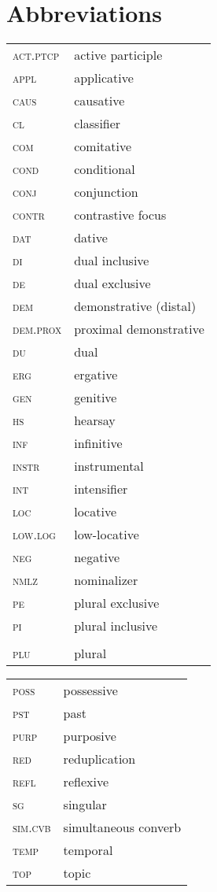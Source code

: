 \documentclass[output=paper]{langscibook}
\begin{document}
\section*{Abbreviations}
\begin{tabularx}{.45\textwidth}{lQ}
\textsc{act.ptcp} & active participle\\
\textsc{appl} &   applicative \\
\textsc{caus} &   causative \\
\textsc{cl} &   classifier \\
\textsc{com} &   comitative \\
\textsc{cond} &   conditional \\
\textsc{conj} &   conjunction \\
\textsc{contr} & contrastive focus \\
\textsc{dat} &   dative \\
\textsc{di} &   dual inclusive \\
\textsc{de} &   dual exclusive \\
\textsc{dem} &   demonstrative (distal) \\
\textsc{dem.prox} &  proximal demonstrative\\
\textsc{du} &  dual\\
\textsc{erg} &  ergative \\
\textsc{gen} &   genitive\\
\textsc{hs} &   hearsay \\
\textsc{inf} &   infinitive\\
\textsc{instr} &   instrumental \\
\textsc{int} &   intensifier\\
\textsc{loc} &   locative\\
\textsc{low.log} & low-locative\\
\textsc{neg} &   negative\\
\textsc{nmlz} &   nominalizer\\
\textsc{pe} &   plural exclusive\\
\textsc{pi} &   plural inclusive\\\\
\textsc{plu} &   plural\\
\end{tabularx}
\begin{tabularx}{.45\textwidth}{lQ}
\textsc{poss} &   possessive\\
\textsc{pst} &   past\\
\textsc{purp} &   purposive\\
\textsc{red} &   reduplication\\
\textsc{refl} &   reflexive\\
\textsc{sg} &   singular\\
\textsc{sim.cvb} & simultaneous converb\\
\textsc{temp} &   temporal\\
\textsc{top} &   topic
\end{tabularx}




{\sloppy\printbibliography[heading=subbibliography,notkeyword=this]}
\end{document}
